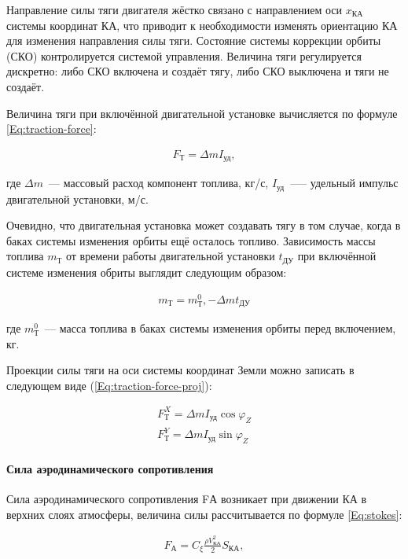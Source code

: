 \documentclass[12pt,a4paper]{article}
\begin{document}
Направление силы тяги двигателя жёстко связано с направлением оси $x_{\text{КА}}$ системы
координат КА, что приводит к необходимости изменять ориентацию КА для изменения
направления силы тяги. Состояние системы коррекции орбиты (СКО) контролируется системой
управления. Величина тяги регулируется дискретно: либо СКО включена и создаёт тягу, либо
СКО выключена и тяги не создаёт.

Величина тяги при включённой двигательной установке вычисляется по формуле
\ref{Eq:traction-force}:

\begin{eqnarray}
  F_{\text{Т}} = \Delta m I_{\text{уд}}, \label{Eq:traction-force}
\end{eqnarray}

где $\Delta m$~--– массовый расход компонент топлива, кг/с, $I_{\text{уд}}$~---– удельный
импульс двигательной установки, м/с.

Очевидно, что двигательная установка может создавать тягу в том случае, когда в баках
системы изменения орбиты ещё осталось топливо. Зависимость массы топлива $m_{\text{Т}}$ от времени
работы двигательной установки $t_{\text{ДУ}}$ при включённой системе изменения обриты выглядит
следующим образом:

\begin{eqnarray}
  m_{\text{Т}} = m_{\text{Т}}^0, - \Delta m t_{\text{ДУ}}
\end{eqnarray}

где $m_{\text{Т}}^0$~--– масса топлива в баках системы изменения орбиты перед включением,
кг.

Проекции силы тяги на оси системы координат Земли можно записать в следующем виде
(\ref{Eq:traction-force-proj}):

\begin{eqnarray}
  F_{\text{Т}}^X = \Delta m I_{\text{уд}} \cos{\varphi_Z} \nonumber \\
  F_{\text{Т}}^Y = \Delta m I_{\text{уд}} \sin{\varphi_Z} \label{Eq:traction-force-proj}
\end{eqnarray}

\paragraph{Сила аэродинамического сопротивления}

Сила аэродинамического сопротивления FА возникает при движении КА в верхних слоях
атмосферы, величина силы рассчитывается по формуле \ref{Eq:stokes}:

\begin{eqnarray}
  F_{\text{А}} = C_\xi \frac{\rho V_{\text{КА}}^2}{2} S_{\text{КА}}, \label{Eq:stokes}
\end{eqnarray}
\end{document}
